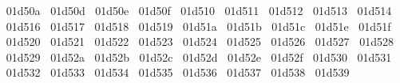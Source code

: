 {  ^^^^^^01d50a%
  ^^^^^^01d50d%
  ^^^^^^01d50e%
  ^^^^^^01d50f%
  ^^^^^^01d510%
  ^^^^^^01d511%
  ^^^^^^01d512%
  ^^^^^^01d513%
  ^^^^^^01d514%
  ^^^^^^01d516%
  ^^^^^^01d517%
  ^^^^^^01d518%
  ^^^^^^01d519%
  ^^^^^^01d51a%
  ^^^^^^01d51b%
  ^^^^^^01d51c%
  ^^^^^^01d51e%
  ^^^^^^01d51f%
  ^^^^^^01d520%
  ^^^^^^01d521%
  ^^^^^^01d522%
  ^^^^^^01d523%
  ^^^^^^01d524%
  ^^^^^^01d525%
  ^^^^^^01d526%
  ^^^^^^01d527%
  ^^^^^^01d528%
  ^^^^^^01d529%
  ^^^^^^01d52a%
  ^^^^^^01d52b%
  ^^^^^^01d52c%
  ^^^^^^01d52d%
  ^^^^^^01d52e%
  ^^^^^^01d52f%
  ^^^^^^01d530%
  ^^^^^^01d531%
  ^^^^^^01d532%
  ^^^^^^01d533%
  ^^^^^^01d534%
  ^^^^^^01d535%
  ^^^^^^01d536%
  ^^^^^^01d537%
  ^^^^^^01d538%
  ^^^^^^01d539%
}
